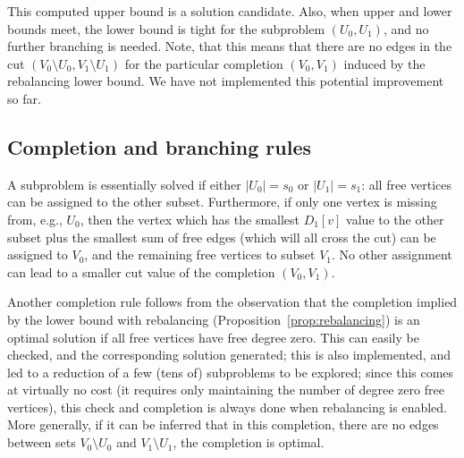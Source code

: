 \documentclass[a4paper,11pt]{article}
\begin{document}
This computed upper bound is a solution candidate. Also, when upper and
lower bounds meet, the lower bound is tight for the subproblem
$(U_0,U_1)$, and no further branching is needed. Note, that this means
that there are no edges in the cut $(V_0\setminus U_0,V_1\setminus
U_1)$ for the particular completion $(V_0,V_1)$ induced by the
rebalancing lower bound.  We have not implemented this potential
improvement so far.

\subsection{Completion and branching rules}

A subproblem is essentially solved if either $|U_0|=s_0$ or
$|U_1|=s_1$: all free vertices can be assigned to the other subset.
Furthermore, if only one vertex is missing from, e.g., $U_0$, then the
vertex which has the smallest $D_1[v]$ value to the other subset plus
the smallest sum of free edges (which will all cross the cut) can be
assigned to $V_0$, and the remaining free vertices to subset $V_1$. No
other assignment can lead to a smaller cut value of the completion
$(V_0,V_1)$.

Another completion rule follows from the observation that the
completion implied by the lower bound with rebalancing
(Proposition~\ref{prop:rebalancing}) is an optimal solution if all free
vertices have free degree zero. This can easily be checked, and the
corresponding solution generated; this is also implemented, and led to
a reduction of a few (tens of) subproblems to be explored; since this
comes at virtually no cost (it requires only maintaining the number of
degree zero free vertices), this check and completion is always done
when rebalancing is enabled. More generally, if it can be inferred
that in this completion, there are no edges between sets $V_0\setminus
U_0$ and $V_1\setminus U_1$, the completion is optimal.
\end{document}
